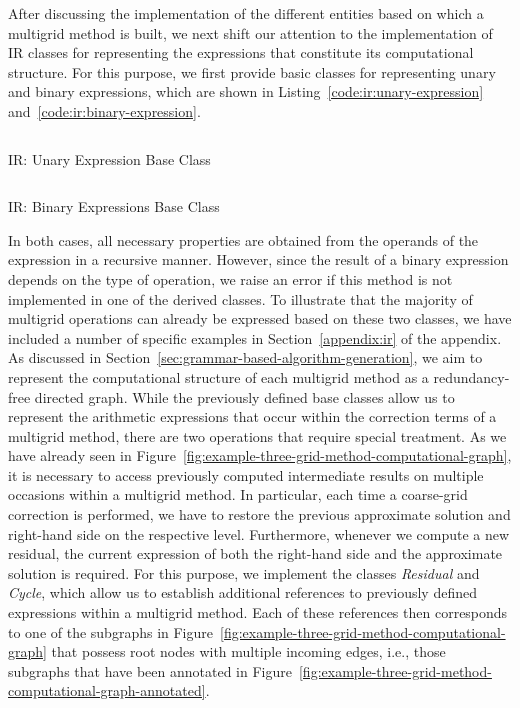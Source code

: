 After discussing the implementation of the different entities based on which a multigrid method is built, we next shift our attention to the implementation of IR classes for representing the expressions that constitute its computational structure. 
For this purpose, we first provide basic classes for representing unary and binary expressions, which are shown in Listing~\ref{code:ir:unary-expression} and~\ref{code:ir:binary-expression}.
\begin{listing}
	\inputminted{python}{evostencils/ir/unary_expression.py}
	\caption{IR: Unary Expression Base Class}
	\label{code:ir:unary-expression}
\end{listing}
\begin{listing}
	\inputminted{python}{evostencils/ir/binary_expression.py}
	\caption{IR: Binary Expressions Base Class}
	\label{code:ir:binary-expression}
\end{listing}
In both cases, all necessary properties are obtained from the operands of the expression in a recursive manner.
However, since the result of a binary expression depends on the type of operation, we raise an error if this method is not implemented in one of the derived classes. 
To illustrate that the majority of multigrid operations can already be expressed based on these two classes, we have included a number of specific examples in Section~\ref{appendix:ir} of the appendix.
As discussed in Section~\ref{sec:grammar-based-algorithm-generation}, we aim to represent the computational structure of each multigrid method as a redundancy-free directed graph. 
While the previously defined base classes allow us to represent the arithmetic expressions that occur within the correction terms of a multigrid method, there are two operations that require special treatment.
As we have already seen in Figure~\ref{fig:example-three-grid-method-computational-graph}, it is necessary to access previously computed intermediate results on multiple occasions within a multigrid method.
In particular, each time a coarse-grid correction is performed, we have to restore the previous approximate solution and right-hand side on the respective level.
Furthermore, whenever we compute a new residual, the current expression of both the right-hand side and the approximate solution is required.
For this purpose, we implement the classes \emph{Residual} and \emph{Cycle}, which allow us to establish additional references to previously defined expressions within a multigrid method.
Each of these references then corresponds to one of the subgraphs in Figure~\ref{fig:example-three-grid-method-computational-graph} that possess root nodes with multiple incoming edges, i.e., those subgraphs that have been annotated in Figure~\ref{fig:example-three-grid-method-computational-graph-annotated}.
